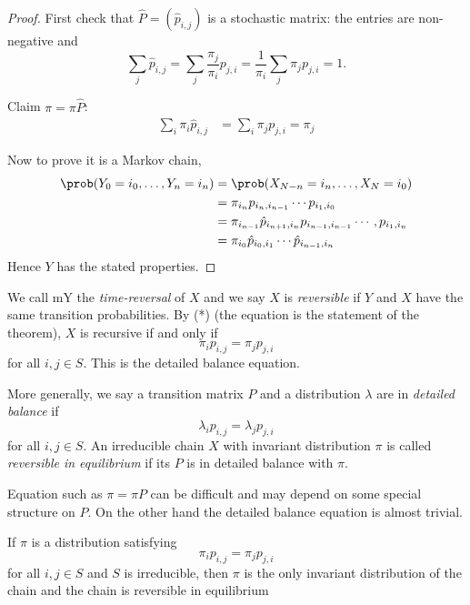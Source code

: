 \documentclass[a4paper]{article}
\begin{document}
\begin{proof}
  First check that \(\hat P = (\hat p_{i,j})\) is a stochastic matrix: the entries are non-negative and
  \[
    \sum_j \hat p_{i,j} = \sum_j \frac{\pi_j}{\pi_i} p_{j, i} = \frac{1}{\pi_i} \sum_j \pi_j p_{j,i} = 1.
  \]

  Claim \(\pi = \pi \hat P\):
  \begin{align*}
    \sum_i \pi_i \hat p_{i,j} &= \sum_i \pi_j p_{j, i} = \pi_j
  \end{align*}

  Now to prove it is a Markov chain,
  \begin{align*}
    \prob(Y_0 = i_0, \dots, Y_n = i_n) &= \prob(X_{N -n} = i_n, \dots, X_N = i_0) \\
                                       &= \pi_{i_n} p_{i_n, i_{n - 1}} \cdots p_{i_1, i_0} \\
                                       &= \pi_{i_{n - 1}} \hat p_{i_{n + 1}, i_n} p_{i_{n - 1}, i_{n - 1}} \cdots, p_{i_1, i_n} \\
                                       &= \pi_{i_0} \hat p_{i_0, i_1} \cdots \hat p_{i_{n - 1}, i_n}
  \end{align*}
  Hence \(Y\) has the stated properties.
\end{proof}

We call mY the \emph{time-reversal} of \(X\) and we say \(X\) is \emph{reversible} if \(Y\) and \(X\) have the same transition probabilities. By (*) (the equation is the statement of the theorem), \(X\) is recursive if and only if
\[
  \pi_i p_{i,j} = \pi_j p_{j, i}
\]
for all \(i, j \in S\). This is the detailed balance equation.

More generally, we say a transition matrix \(P\) and a distribution \(\lambda\) are in \emph{detailed balance} if
\[
  \lambda_i p_{i, j} = \lambda_j p_{j, i}
\]
for all \(i, j \in S\). An irreducible chain \(X\) with invariant distribution \(\pi\) is called \emph{reversible in equilibrium} if its \(P\) is in detailed balance with \(\pi\).

Equation such as \(\pi = \pi P\) can be difficult and may depend on some special structure on \(P\). On the other hand the detailed balance equation is almost trivial.

\begin{proposition}
  If \(\pi\) is a distribution satisfying
  \[
    \pi_i p_{i, j} = \pi_j p_{j, i}
  \]
  for all \(i, j \in S\) and \(S\) is irreducible, then \(\pi\) is the only invariant distribution of the chain and the chain is reversible in equilibrium
\end{proposition}
\end{document}
